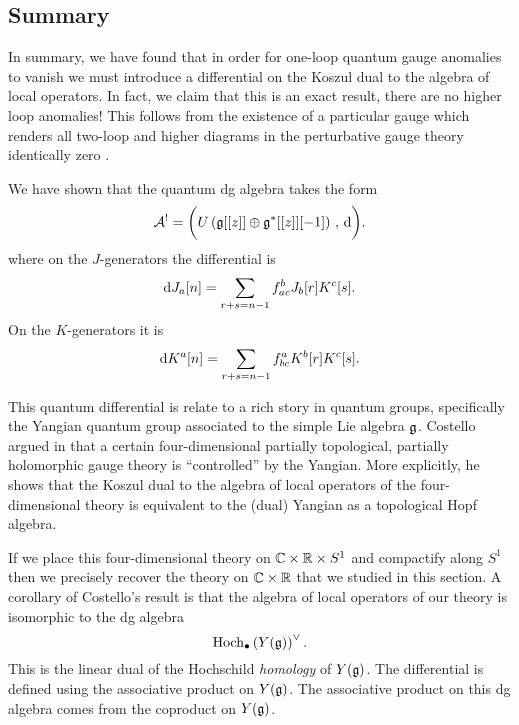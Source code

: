 \documentclass[11pt]{amsart}
\begin{document}
\subsection{Summary} 

In summary, we have found that in order for one-loop quantum gauge anomalies to vanish we must introduce a differential on the Koszul dual to the algebra of local operators.
In fact, we claim that this is an exact result, there are no higher loop anomalies!
This follows from the existence of a particular gauge which renders all two-loop and higher diagrams in the perturbative gauge theory identically zero \cite{GWcs}. 

We have shown that the quantum dg algebra takes the form
\[
\mathcal A^! = \bigg( U\left(\mathfrak g[[z]] \oplus \mathfrak g^*[[z]] [-1] \right) \, , \, {\rm d} \bigg) .
\]
where on the $J$-generators the differential is
\[
{\rm d} J_a[n] = \sum_{r + s = n-1} f_{ac}^b J_b[r] K^c[s]  .
\]
On the $K$-generators it is
\[
{\rm d} K^a[n] = \sum_{r + s = n-1} f_{bc}^a K^b[r] K^c [s] .
\]

This quantum differential is relate to a rich story in quantum groups, specifically the Yangian quantum group associated to the simple Lie algebra $\mathfrak g$. 
Costello argued in \cite{CosYangian} that a certain four-dimensional partially topological, partially holomorphic gauge theory is ``controlled'' by the Yangian.
More explicitly, he shows that the Koszul dual to the algebra of local operators of the four-dimensional theory is equivalent to the (dual) Yangian as a topological Hopf algebra.  

If we place this four-dimensional theory on $\mathbb C \times \mathbb R \times S^1$ and compactify along $S^1$ then we precisely recover the theory on $\mathbb C \times \mathbb R$ that we studied in this section. 
A corollary of Costello's result is that the algebra of local operators of our theory is isomorphic to the dg algebra
\[
{\rm Hoch}_{\bullet}\left( Y (\mathfrak g) \right)^\vee .
\]
This is the linear dual of the Hochschild {\em homology} of $Y(\mathfrak g)$. 
The differential is defined using the associative product on $Y(\mathfrak g)$.
The associative product on this dg algebra comes from the coproduct on $Y(\mathfrak g)$. 
\end{document}
